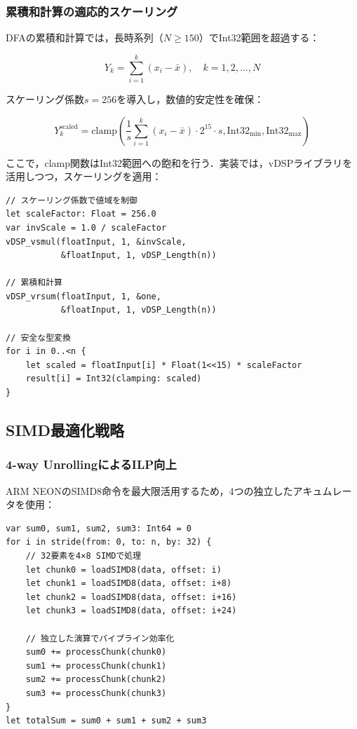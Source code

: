 \documentclass[paper]{ieice}
\begin{document}
\subsubsection{累積和計算の適応的スケーリング}
DFAの累積和計算では，長時系列（$N \geq 150$）でInt32範囲を超過する：

\begin{equation}
Y_k = \sum_{i=1}^{k} (x_i - \bar{x}), \quad k = 1, 2, ..., N
\end{equation}

スケーリング係数$s=256$を導入し，数値的安定性を確保：

\begin{equation}
Y_k^{\text{scaled}} = \text{clamp}\left(\frac{1}{s} \sum_{i=1}^{k} (x_i - \bar{x}) \cdot 2^{15} \cdot s, \text{Int32}_{\min}, \text{Int32}_{\max}\right)
\end{equation}

ここで，clamp関数はInt32範囲への飽和を行う．実装では，vDSPライブラリを活用しつつ，スケーリングを適用：

\begin{lstlisting}[caption=累積和の安定化実装]
// スケーリング係数で値域を制御
let scaleFactor: Float = 256.0
var invScale = 1.0 / scaleFactor
vDSP_vsmul(floatInput, 1, &invScale, 
           &floatInput, 1, vDSP_Length(n))

// 累積和計算
vDSP_vrsum(floatInput, 1, &one, 
           &floatInput, 1, vDSP_Length(n))

// 安全な型変換
for i in 0..<n {
    let scaled = floatInput[i] * Float(1<<15) * scaleFactor
    result[i] = Int32(clamping: scaled)
}
\end{lstlisting}

\subsection{SIMD最適化戦略}

\subsubsection{4-way UnrollingによるILP向上}
ARM NEONのSIMD8命令を最大限活用するため，4つの独立したアキュムレータを使用：

\begin{lstlisting}[caption=4-way unrollingの実装]
var sum0, sum1, sum2, sum3: Int64 = 0
for i in stride(from: 0, to: n, by: 32) {
    // 32要素を4×8 SIMDで処理
    let chunk0 = loadSIMD8(data, offset: i)
    let chunk1 = loadSIMD8(data, offset: i+8)
    let chunk2 = loadSIMD8(data, offset: i+16)
    let chunk3 = loadSIMD8(data, offset: i+24)
    
    // 独立した演算でパイプライン効率化
    sum0 += processChunk(chunk0)
    sum1 += processChunk(chunk1)
    sum2 += processChunk(chunk2)
    sum3 += processChunk(chunk3)
}
let totalSum = sum0 + sum1 + sum2 + sum3
\end{lstlisting}
\end{document}
